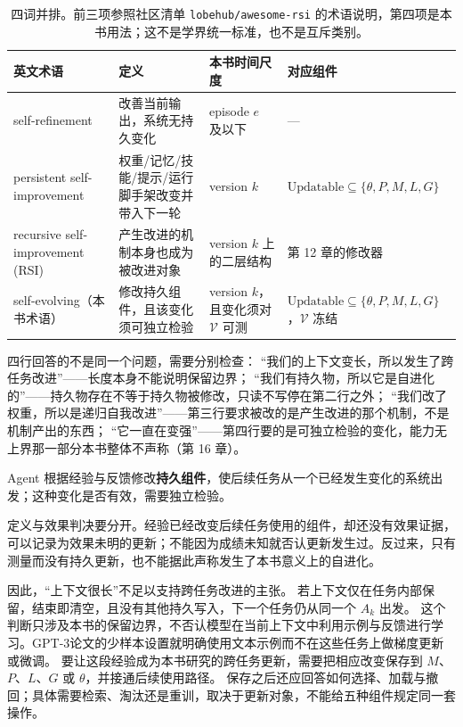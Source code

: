 \begin{table}[htbp]
\centering
\begin{tabular}{@{}>{\raggedright\arraybackslash}p{3.6cm}>{\raggedright\arraybackslash}p{5.0cm}>{\raggedright\arraybackslash}p{2.4cm}>{\raggedright\arraybackslash}p{2.6cm}@{}}
\toprule
英文术语 & 定义 & 本书时间尺度 & 对应组件 \\
\midrule
self-refinement & 改善当前输出，系统无持久变化 & episode $e$ 及以下 & — \\
persistent self-improvement & 权重/记忆/技能/提示/运行脚手架改变并带入下一轮 & version $k$ & $\text{Updatable}\subseteq\{\theta,P,M,L,G\}$ \\
recursive self-improvement (RSI) & 产生改进的机制本身也成为被改进对象 & version $k$ 上的二层结构 & 第 12 章的修改器 \\
self-evolving（本书术语） & 修改持久组件，且该变化须可独立检验 & version $k$，且变化须对 $\mathcal V$ 可测 & $\text{Updatable}\subseteq\{\theta,P,M,L,G\}$，$\mathcal V$ 冻结 \\
\bottomrule
\end{tabular}
\caption{四词并排。前三项参照社区清单 \texttt{lobehub/awesome-rsi} 的术语说明，第四项是本书用法；这不是学界统一标准，也不是互斥类别。}
\label{tab:rsi-terms}
\end{table}

四行回答的不是同一个问题，需要分别检查：
“我们的上下文变长，所以发生了跨任务改进”——长度本身不能说明保留边界；
``我们有持久物，所以它是自进化的''——持久物存在不等于持久物被修改，只读不写停在第二行之外；
``我们改了权重，所以是递归自我改进''——第三行要求被改的是产生改进的那个机制，不是机制产出的东西；
``它一直在变强''——第四行要的是可独立检验的变化，能力无上界那一部分本书整体不声称（第 16 章）。

\begin{definition}[自进化]
Agent 根据经验与反馈修改\textbf{持久组件}，使后续任务从一个已经发生变化的系统出发；这种变化是否有效，需要独立检验。
\end{definition}

定义与效果判决要分开。经验已经改变后续任务使用的组件，却还没有效果证据，可以记录为效果未明的更新；不能因为成绩未知就否认更新发生过。反过来，只有测量而没有持久更新，也不能据此声称发生了本书意义上的自进化。

因此，“上下文很长”不足以支持跨任务改进的主张。
若上下文仅在任务内部保留，结束即清空，且没有其他持久写入，下一个任务仍从同一个 $A_k$ 出发。
这个判断只涉及本书的保留边界，不否认模型在当前上下文中利用示例与反馈进行学习。GPT-3论文的少样本设置就明确使用文本示例而不在这些任务上做梯度更新或微调\cite{brown-few-shot-2005}。
要让这段经验成为本书研究的跨任务更新，需要把相应改变保存到 $M$、$P$、$L$、$G$ 或 $\theta$，并接通后续使用路径。
保存之后还应回答如何选择、加载与撤回；具体需要检索、淘汰还是重训，取决于更新对象，不能给五种组件规定同一套操作。

